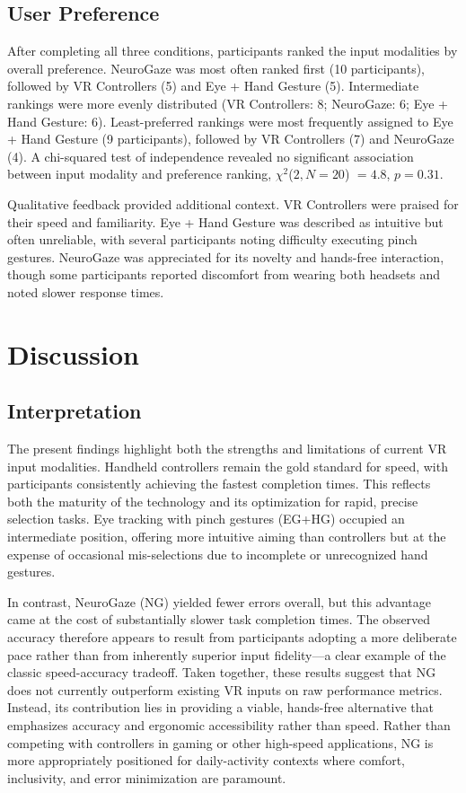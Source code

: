 \documentclass[utf8]{FrontiersinHarvard} %
\begin{document}
\subsection{User Preference}
After completing all three conditions, participants ranked the input modalities by overall preference. NeuroGaze was most often ranked first (10 participants), followed by VR Controllers (5) and Eye + Hand Gesture (5). Intermediate rankings were more evenly distributed (VR Controllers: 8; NeuroGaze: 6; Eye + Hand Gesture: 6). Least-preferred rankings were most frequently assigned to Eye + Hand Gesture (9 participants), followed by VR Controllers (7) and NeuroGaze (4). A chi-squared test of independence revealed no significant association between input modality and preference ranking, $\chi^2$($2, N = 20$) $= 4.8$, $p = 0.31$.

Qualitative feedback provided additional context. VR Controllers were praised for their speed and familiarity. Eye + Hand Gesture was described as intuitive but often unreliable, with several participants noting difficulty executing pinch gestures. NeuroGaze was appreciated for its novelty and hands-free interaction, though some participants reported discomfort from wearing both headsets and noted slower response times.

\section{Discussion}
\subsection{Interpretation}
The present findings highlight both the strengths and limitations of current VR input modalities. Handheld controllers remain the gold standard for speed, with participants consistently achieving the fastest completion times. This reflects both the maturity of the technology and its optimization for rapid, precise selection tasks. Eye tracking with pinch gestures (EG+HG) occupied an intermediate position, offering more intuitive aiming than controllers but at the expense of occasional mis-selections due to incomplete or unrecognized hand gestures.

In contrast, NeuroGaze (NG) yielded fewer errors overall, but this advantage came at the cost of substantially slower task completion times. The observed accuracy therefore appears to result from participants adopting a more deliberate pace rather than from inherently superior input fidelity—a clear example of the classic speed-accuracy tradeoff. Taken together, these results suggest that NG does not currently outperform existing VR inputs on raw performance metrics. Instead, its contribution lies in providing a viable, hands-free alternative that emphasizes accuracy and ergonomic accessibility \citep{101371,6451193} rather than speed. Rather than competing with controllers in gaming or other high-speed applications, NG is more appropriately positioned for daily-activity contexts where comfort, inclusivity, and error minimization are paramount.
\end{document}

